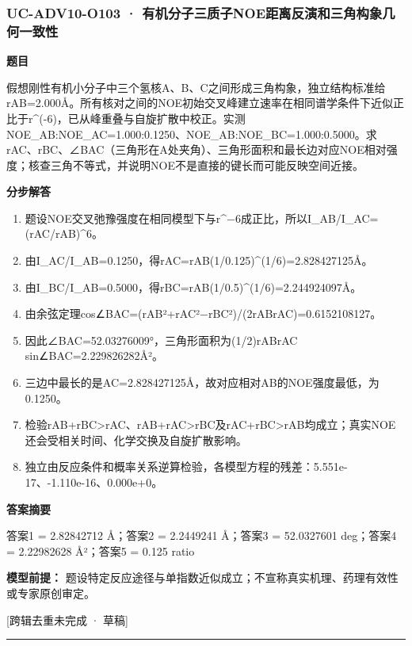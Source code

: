 \documentclass[UTF8,11pt,a4paper]{ctexart}
\begin{document}
\subsubsection*{UC-ADV10-O103 · 有机分子三质子NOE距离反演和三角构象几何一致性}
\noindent\textbf{题目}\par
假想刚性有机小分子中三个氢核A、B、C之间形成三角构象，独立结构标准给rAB=2.000Å。所有核对之间的NOE初始交叉峰建立速率在相同谱学条件下近似正比于r\textasciicircum{}(-6)，已从峰重叠与自旋扩散中校正。实测NOE\_AB:NOE\_AC=1.000:0.1250、NOE\_AB:NOE\_BC=1.000:0.5000。求rAC、rBC、∠BAC（三角形在A处夹角）、三角形面积和最长边对应NOE相对强度；核查三角不等式，并说明NOE不是直接的键长而可能反映空间近接。\par
\medskip\noindent\textbf{分步解答}
\begin{enumerate}
\item 题设NOE交叉弛豫强度在相同模型下与r\textasciicircum{}−6成正比，所以I\_AB/I\_AC=(rAC/rAB)\textasciicircum{}6。
\item 由I\_AC/I\_AB=0.1250，得rAC=rAB(1/0.125)\textasciicircum{}(1/6)=2.828427125Å。
\item 由I\_BC/I\_AB=0.5000，得rBC=rAB(1/0.5)\textasciicircum{}(1/6)=2.244924097Å。
\item 由余弦定理cos∠BAC=(rAB²+rAC²−rBC²)/(2rABrAC)=0.6152108127。
\item 因此∠BAC=52.03276009°，三角形面积为(1/2)rABrAC sin∠BAC=2.229826282Å²。
\item 三边中最长的是AC=2.828427125Å，故对应相对AB的NOE强度最低，为0.1250。
\item 检验rAB+rBC>rAC、rAB+rAC>rBC及rAC+rBC>rAB均成立；真实NOE还会受相关时间、化学交换及自旋扩散影响。
\item 独立由反应条件和概率关系逆算检验，各模型方程的残差：5.551e-17、-1.110e-16、0.000e+0。
\end{enumerate}
\noindent\textbf{答案摘要}\par
答案1 = 2.82842712 Å；答案2 = 2.2449241 Å；答案3 = 52.0327601 deg；答案4 = 2.22982628 Å²；答案5 = 0.125 ratio\par
\noindent\textbf{模型前提：}
题设特定反应途径与单指数近似成立；不宣称真实机理、药理有效性或专家原创审定。\par
\noindent\textcolor{red!65!black}{[跨辑去重未完成 · 草稿]} \par
\medskip\hrule\medskip
{}
\end{document}

